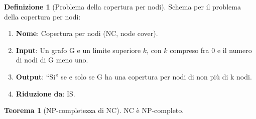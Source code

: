 \documentclass[12pt]{article}
\theoremstyle{definition}
\newtheorem*{mydef}{Definizione}
\newtheorem*{mytheo}{Teorema}
\begin{document}
\begin{mydef}[Problema della copertura per nodi]
  Schema per il problema della copertura per nodi:

  \begin{enumerate}
  \item \textbf{Nome}: Copertura per nodi (NC, node cover).
  \item \textbf{Input}: Un grafo G e un limite superiore \(k\), con \(k\) compreso
    fra 0 e il numero di nodi di G meno uno.
  \item \textbf{Output}: ``Si'' se e solo se G ha una copertura per nodi di non pi\`u di k nodi.
  \item \textbf{Riduzione da}: IS.
  \end{enumerate}
\end{mydef}

\begin{mytheo}[NP-completezza di NC]
  NC \`e NP-completo.
\end{mytheo}
\end{document}
